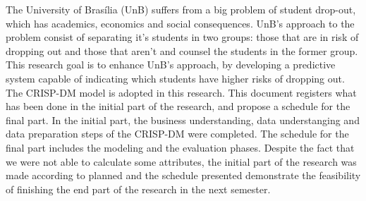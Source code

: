 The University of Brasília (UnB) suffers from a big problem of student drop-out, which has
academics, economics and social consequences. UnB's approach to the problem consist
of separating it's students in two groups: those that are in risk of dropping out
and those that aren't and counsel the students in the former group. This research
goal is to enhance UnB's approach, by developing a predictive system capable of
indicating which students have higher risks of dropping out. The CRISP-DM model is
adopted in this research. 
This document registers what has been done in the initial part of the research, and
propose a schedule for the final part. In the initial part, the business
understanding, data understanging and data preparation steps of the CRISP-DM were
completed. The schedule for the final part includes the modeling and the evaluation
phases.  
Despite the fact that we were not able to calculate some attributes, the initial
part of the research was made according to planned and the schedule presented
demonstrate the feasibility of finishing the end part of the research in the next
semester. 
